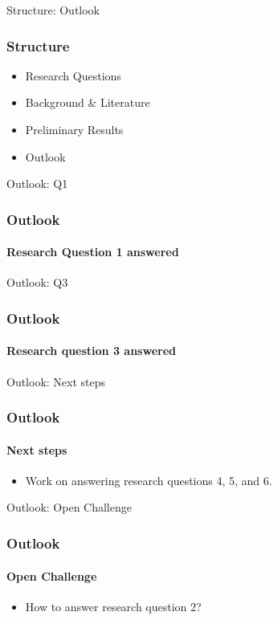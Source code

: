 \begin{frame}[label=outlook]{Structure: Outlook}
    \frametitle{Structure}
    \begin{itemize}
        \item Research Questions
        \item Background \& Literature
        \item Preliminary Results
        \item {\color{tud grapefruit}Outlook}
    \end{itemize}
\end{frame}

\begin{frame}[label=outlook]{Outlook: Q1}
    \frametitle{Outlook}
    \framesubtitle{Research Question 1 answered}
\end{frame}

\begin{frame}[label=outlook]{Outlook: Q3}
    \frametitle{Outlook}
    \framesubtitle{Research question 3 answered}
\end{frame}

\begin{frame}[label=outlook]{Outlook: Next steps}
    \frametitle{Outlook}
    \framesubtitle{Next steps}
    \begin{itemize}
        \item Work on answering research questions 4, 5, and 6.
    \end{itemize}
\end{frame}

\begin{frame}[label=outlook]{Outlook: Open Challenge}
    \frametitle{Outlook}
    \framesubtitle{Open Challenge}
    \begin{itemize}
        \item How to answer research question 2?
    \end{itemize}
\end{frame}